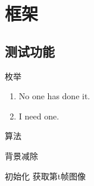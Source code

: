 \section{框架}

\subsection{测试功能}

\begin{frame}{枚举}
    \begin{enumerate}
        \item No one has done it.
        \item I need one.
    \end{enumerate}
\end{frame}

\begin{frame}{算法}
    \begin{algorithm}[H]
        \caption{背景减除}
        \begin{algorithmic}[1]
            \STATE 初始化
            \REPEAT
            \STATE 获取第t帧图像
        \end{algorithmic}
    \end{algorithm}
\end{frame}
